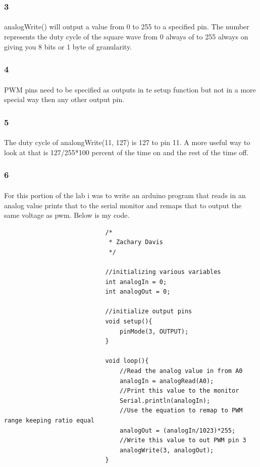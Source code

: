 \documentclass[12pt]{article}
\begin{document}
			\subsubsection{3}
				\paragraph{}
					analogWrite() will output a value from 0 to 255 to a specified pin. The number represents the duty cycle of the square wave from 0 always of to 255 always
					on giving you 8 bits or 1 byte of granularity.

			\subsubsection{4}
				\paragraph{}
					PWM pins need to be specified as outputs in te setup function but not in a more special way then any other output pin.

			\subsubsection{5}
				\paragraph{}
					The duty cycle of analongWrite(11, 127) is 127 to pin 11.  A more useful way to look at that is 127/255*100 percent of the time on and 
					the rest of the time off.

			\subsubsection{6}
				\paragraph{}
					For this portion of the lab i was to write an arduino program that reads in an analog value prints that to the serial monitor and remaps that to output 
					the same voltage as pwm.  Below is my code.

					\begin{center}
						\begin{verbatim}
							/*
							 * Zachary Davis
							 */

							//initializing various variables
							int analogIn = 0;
							int analogOut = 0;

							//initialize output pins
							void setup(){
  				 				pinMode(3, OUTPUT);
							}

							void loop(){
  								//Read the analog value in from A0
  								analogIn = analogRead(A0);
  								//Print this value to the monitor
  								Serial.println(analogIn);
  								//Use the equation to remap to PWM range keeping ratio equal
  								analogOut = (analogIn/1023)*255;
  								//Write this value to out PWM pin 3
  								analogWrite(3, analogOut);
							}
						\end{verbatim}
					\end{center}
\end{document}
